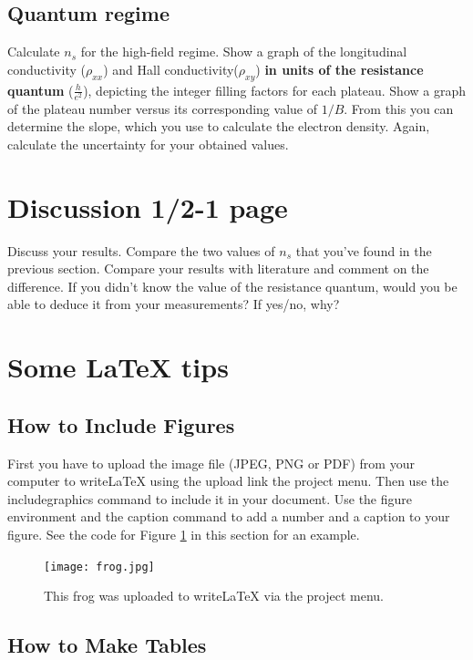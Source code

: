 \documentclass[letterpaper]{article}
\begin{document}
\subsection{Quantum regime}
Calculate $n_{s}$ for the high-field regime.
Show a graph of the longitudinal conductivity ($\rho_{xx}$) and Hall conductivity($\rho_{xy}$) \textbf{in units of the resistance quantum} ($\frac{h}{e^{2}}$), depicting the integer filling factors for each plateau.
Show a graph of the plateau number versus its corresponding value of $1/B$. From this you can determine the slope, which you use to calculate the electron density.
Again, calculate the uncertainty for your obtained values.

\section{Discussion 1/2-1 page}
Discuss your results. Compare the two values of $n_{s}$ that you've found in the previous section. Compare your results with literature and comment on the difference. If you didn't know the value of the resistance quantum, would you be able to deduce it from your measurements? If yes/no, why?

\newpage
\section{Some LaTeX tips}
\label{sec:latex}
\subsection{How to Include Figures}

First you have to upload the image file (JPEG, PNG or PDF) from your computer to writeLaTeX using the upload link the project menu. Then use the includegraphics command to include it in your document. Use the figure environment and the caption command to add a number and a caption to your figure. See the code for Figure \ref{fig:frog} in this section for an example.

\begin{figure}
\centering
\texttt{[image: frog.jpg]}
\caption{\label{fig:frog}This frog was uploaded to writeLaTeX via the project menu.}
\end{figure}

\subsection{How to Make Tables}
\end{document}
